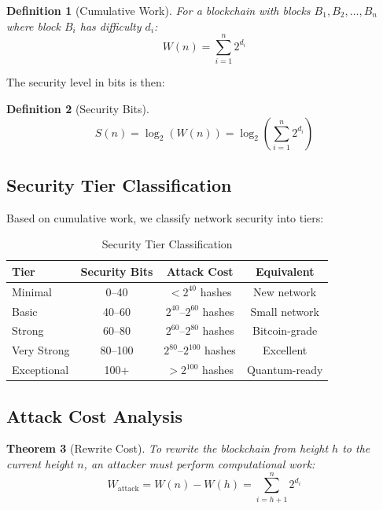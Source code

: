 \documentclass[11pt,a4paper]{article}
\newtheorem{theorem}{Theorem}[section]
\newtheorem{definition}[theorem]{Definition}
\begin{document}
\begin{definition}[Cumulative Work]
For a blockchain with blocks $B_1, B_2, \ldots, B_n$ where block $B_i$ has difficulty $d_i$:
\begin{equation}
    W(n) = \sum_{i=1}^{n} 2^{d_i}
\end{equation}
\end{definition}

The security level in bits is then:

\begin{definition}[Security Bits]
\begin{equation}
    S(n) = \log_2(W(n)) = \log_2\left(\sum_{i=1}^{n} 2^{d_i}\right)
\end{equation}
\end{definition}

\subsection{Security Tier Classification}

Based on cumulative work, we classify network security into tiers:

\begin{table}[h]
\centering
\caption{Security Tier Classification}
\begin{tabular}{lccc}
\toprule
\textbf{Tier} & \textbf{Security Bits} & \textbf{Attack Cost} & \textbf{Equivalent} \\
\midrule
Minimal & 0--40 & $< 2^{40}$ hashes & New network \\
Basic & 40--60 & $2^{40}$--$2^{60}$ hashes & Small network \\
Strong & 60--80 & $2^{60}$--$2^{80}$ hashes & Bitcoin-grade \\
Very Strong & 80--100 & $2^{80}$--$2^{100}$ hashes & Excellent \\
Exceptional & 100+ & $> 2^{100}$ hashes & Quantum-ready \\
\bottomrule
\end{tabular}
\end{table}

\subsection{Attack Cost Analysis}

\begin{theorem}[Rewrite Cost]
To rewrite the blockchain from height $h$ to the current height $n$, an attacker must perform computational work:
\begin{equation}
    W_{\text{attack}} = W(n) - W(h) = \sum_{i=h+1}^{n} 2^{d_i}
\end{equation}
\end{theorem}
\end{document}
